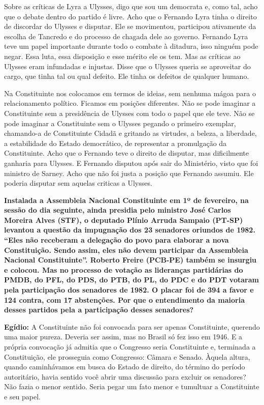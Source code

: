 Sobre as críticas de Lyra a Ulysses, digo que sou um democrata e, como
tal, acho que o debate dentro do partido é livre. Acho que o Fernando
Lyra tinha o direito de discordar do Ulysses e disputar. Ele se
movimentou, participou ativamente da escolha de Tancredo e do processo
de chagada dele ao governo. Fernando Lyra teve um papel importante
durante todo o combate à ditadura, isso ninguém pode negar. Essa luta,
essa disposição e esse mérito ele os tem. Mas as críticas ao Ulysses
eram infundadas e injustas. Disse que o Ulysses queria se aproveitar do
cargo, que tinha tal ou qual defeito. Ele tinha os defeitos de qualquer
humano.

Na Constituinte nos colocamos em termos de ideias, sem nenhuma mágoa
para o relacionamento político. Ficamos em posições diferentes. Não se
pode imaginar a Constituinte sem a presidência de Ulysses com todo o
papel que ele teve. Não se pode imaginar a Constituinte sem o Ulysses
pegando o primeiro exemplar, chamando-a de Constituinte Cidadã e
gritando as virtudes, a beleza, a liberdade, a estabilidade do Estado
democrático, de representar a promulgação da Constituinte. Acho que o
Fernando teve o direito de disputar, mas dificilmente ganharia para
Ulysses. E Fernando disputou após sair do Ministério, visto que foi
ministro de Sarney. Acho que não foi justa a posição que Fernando
assumiu. Ele poderia disputar sem aquelas criticas a Ulysses.

\textbf{Instalada a Assembleia Nacional Constituinte em 1º de fevereiro,
na sessão do dia seguinte, ainda presidia pelo ministro José Carlos
Moreira Alves (STF), o deputado Plínio Arruda Sampaio (PT-SP) levantou a
questão da impugnação dos 23 senadores oriundos de 1982. ``Eles não
receberam a delegação do povo para elaborar a nova Constituição. Sendo
assim, eles não devem participar da Assembleia Nacional Constituinte''.
Roberto Freire (PCB-PE) também se insurgiu e colocou. Mas no processo de
votação as lideranças partidárias do PMDB, do PFL, do PDS, do PTB, do
PL, do PDC e do PDT votaram pela participação dos senadores de 1982. O
placar foi de 394 a favor e 124 contra, com 17 abstenções. Por que o
entendimento da maioria desses partidos pela a participação desses
senadores?}

\textbf{Egídio:} A Constituinte não foi convocada para ser apenas
Constituinte, querendo uma maior pureza. Deveria ser assim, mas no
Brasil só fez isso em 1946. E a própria convocação já admitia que o
Congresso seria Constituinte e, terminada a Constituição, ele prosseguia
como Congresso: Câmara e Senado. Àquela altura, quando caminhávamos em
busca do Estado de direito, do término do período autoritário, havia
sentido você abrir uma discussão para excluir os senadores? Não fazia o
menor sentido. Seria pegar um fato menor e tumultuar a Constituinte e
seu papel.

